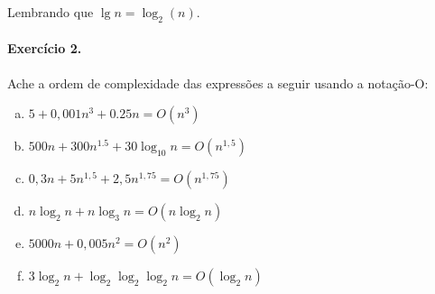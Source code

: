 \documentclass{article}
\begin{document}
\noindent Lembrando que $\lg n = \log_2(n)$.

\paragraph{Exercício 2.} Ache a ordem de complexidade das expressões a seguir usando a notação-O:

\begin{enumerate}[a)]
\item $5 + 0,001n^3 + 0.25n=O(n^3)$
\item $500n + 300n^{1.5}+30\log_{10}n=O(n^{1,5})$
\item $0,3n+5n^{1,5}+2,5n^{1,75}=O(n^{1,75})$
\item $n\log_2n + n\log_3n=O(n\log_2n)$
\item $5000n + 0,005n^2=O(n^2)$
\item $3\log_2n + \log_2\log_2\log_2n=O(\log_2n)$
\end{enumerate}
\end{document}
